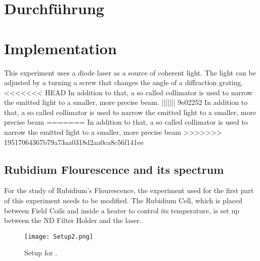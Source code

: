 \section{Durchführung}
\label{sec:Durchführung}

\section{Implementation}
\label{sec:implementation}
This experiment uses a diode laser as a source of coherent light. The light can be adjusted by a turning a screw that changes the angle of a diffraction grating. 
<<<<<<< HEAD
In addition to that, a so called collimator is used to narrow the emitted light to a smaller, more precise beam. 
||||||| 9e02252
In addition to that, a so called collimator is used to narrow the emitted light to a smaller, more precise beam 
=======
In addition to that, a so called collimator is used to narrow the emitted light to a smaller, more precise beam  
>>>>>>> 19517064367b79a73aa0318d2aa0ca8c56f141ee


\subsection{Rubidium Flourescence and its spectrum}
\label{sec:Rubi}
For the study of Rubidium's Flourescence, the experiment used for the first part of this experiment needs to be modified.
The Rubidium Cell, which is placed between Field Coils and inside a heater to control its temperature, is set up between the ND Filter Holder and the laser.

\begin{wrapfigure}{r}{0.32\textwidth}
    \begin{center}
        \texttt{[image: Setup2.png]}
        \caption{Setup for \cite{ap60}.}
        \label{fig:Setup2}
    \end{center} 
\end{wrapfigure}